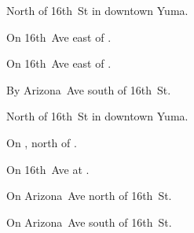 
\begin{LocationList}

North of 16th~St in downtown Yuma.

\Location{\GarageHQ \Garage}
On 16th~Ave east of .

On 16th~Ave east of .

By Arizona~Ave south of 16th~St.

North of 16th~St in downtown Yuma.

On , north of  .

\Location{\TruckStop \Gas \Rest \Weigh}
On 16th~Ave at .

On Arizona~Ave north of 16th~St.

On Arizona~Ave south of 16th~St.

\end{LocationList}
